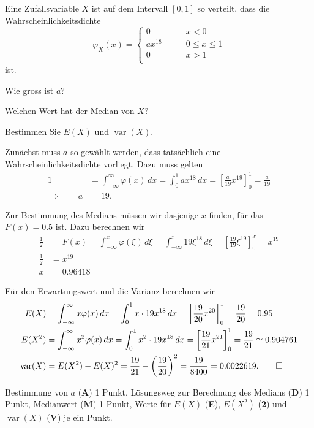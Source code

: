 Eine Zufallsvariable $X$ ist auf dem Intervall $[0,1]$ so verteilt, dass die
Wahrscheinlichkeitsdichte
\[
\varphi_X(x)=\begin{cases}
0&\qquad x < 0\\
ax^{18}&\qquad 0\le x \le 1\\
0&\qquad x > 1\\
\end{cases}
\]
ist.
\begin{teilaufgaben}
\item Wie gross ist $a$?
\item Welchen Wert hat der Median von $X$?
\item Bestimmen Sie $E(X)$ und $\operatorname{var}(X)$.
\end{teilaufgaben}


\begin{loesung}
\begin{teilaufgaben}
\item
Zunächst muss $a$ so gewählt werden, dass tatsächlich eine
Wahrscheinlichkeitsdichte vorliegt. Dazu muss gelten
\begin{align*}
1
&=
\int_{-\infty}^{\infty} \varphi(x)\,dx
=
\int_0^1 ax^{18}\,dx
=
\left[
\frac{a}{19}x^{19}
\right]_0^1
=\frac{a}{19}
\\
\Rightarrow \qquad a&= 19.
\end{align*}
\item
Zur Bestimmung des Medians müssen wir dasjenige $x$ finden, für das 
$F(x)=0.5$ ist. Dazu berechnen wir
\begin{align*}
\frac12
&=
F(x)
=
\int_{-\infty}^x \varphi(\xi)\,d\xi
=
\int_{-\infty}^x 19\xi^{18}\,d\xi
=
\left[
\frac{19}{19}\xi^{19}
\right]_0^x
=x^{19}
\\
\frac12&=x^{19}\\
x&=0.96418
\end{align*}
\item
Für den Erwartungswert und die Varianz berechnen wir
\begin{align*}
E(X)
&=
\int_{-\infty}^\infty x\varphi(x)\,dx
=
\int_0^1x\cdot 19x^{18}\,dx
=
\left[
\frac{19}{20}x^{20}
\right]_0^1
=\frac{19}{20}=0.95
\\
E(X^2)
&=
\int_{-\infty}^\infty x^2\varphi(x)\,dx
=
\int_0^1x^2\cdot 19x^{18}\,dx
=
\left[
\frac{19}{21}x^{21}
\right]_0^1
=\frac{19}{21}
\simeq 0.904761
\\
\operatorname{var}(X)
&=
E(X^2)-E(X)^2
=
\frac{19}{21}-\biggl(\frac{19}{20}\biggr)^2
=
\frac{19}{8400}=0.0022619.
\qedhere
\end{align*}
\end{teilaufgaben}
\end{loesung}

\begin{bewertung}
Bestimmung von $a$ ({\bf A}) 1 Punkt,
Lösungsweg zur Berechnung des Medians ({\bf D}) 1 Punkt,
Medianwert ({\bf M}) 1 Punkt,
Werte für $E(X)$ ({\bf E}),
$E(X^2)$  ({\bf 2}) und $\operatorname{var}(X)$ ({\bf V}) je ein Punkt.
\end{bewertung}

